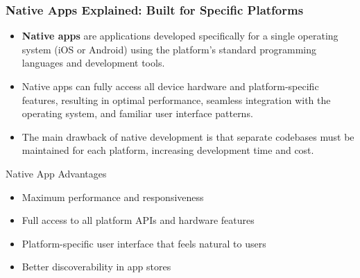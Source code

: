 \documentclass{beamer}
\begin{document}
	\begin{frame}
		\frametitle{Native Apps Explained: Built for Specific Platforms}
		
		\begin{itemize}
			\item \textbf{Native apps} are applications developed specifically for a single operating system (iOS or Android) using the platform's standard programming languages and development tools.
			\item Native apps can fully access all device hardware and platform-specific features, resulting in optimal performance, seamless integration with the operating system, and familiar user interface patterns.
			\item The main drawback of native development is that separate codebases must be maintained for each platform, increasing development time and cost.
		\end{itemize}
		
		\begin{alertblock}{\scriptsize{Native App Advantages}}
			\scriptsize{
				\begin{itemize}
					\item Maximum performance and responsiveness
					\item Full access to all platform APIs and hardware features
					\item Platform-specific user interface that feels natural to users
					\item Better discoverability in app stores
				\end{itemize}
			}
		\end{alertblock}
		
	\end{frame}
	
\end{document}
